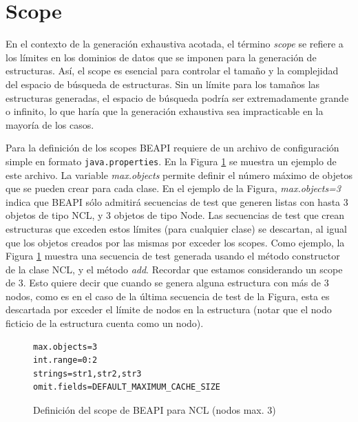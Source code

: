 \section{Scope}
\label{sec:scope}

En el contexto de la generación exhaustiva acotada, el término \emph{scope} se
refiere a los límites en los dominios de datos que se imponen para la generación de
estructuras. 
Así, el scope es esencial para controlar el tamaño y la complejidad del espacio de búsqueda de estructuras. 
Sin un límite para los tamaños las estructuras generadas,
 el espacio de búsqueda podría ser extremadamente grande o infinito, lo que haría
 que la generación exhaustiva sea impracticable en la mayoría de los casos. 

Para la definición de los scopes BEAPI requiere de un archivo de configuración
simple en formato \texttt{java.properties}. En la Figura \ref{fig:NCL-fin-BEAPI}
se muestra un ejemplo de este archivo. 
La variable \emph{max.objects} permite definir el número
máximo de objetos que se pueden crear para cada clase. En el ejemplo de la
Figura, \emph{max.objects=3} indica que BEAPI sólo admitirá secuencias de test que
generen listas con hasta 3 objetos de tipo NCL, y 3 objetos de tipo Node. Las
secuencias de test que crean estructuras que 
exceden estos límites (para cualquier clase) se descartan, al igual que los
objetos creados por las mismas por exceder los scopes. Como ejemplo, la Figura
\ref{sec:scope} muestra una secuencia de test generada usando el método constructor
de la clase NCL, y el método \emph{add}. Recordar que estamos considerando un scope de 3. 
Esto quiere decir que cuando se genera alguna estructura con más de 3 nodos, como es en 
el caso de la última secuencia de test de la Figura, esta es descartada por exceder el 
límite de nodos en la estructura (notar que el nodo ficticio de la estructura cuenta como un
nodo). 



\begin{figure}[H]
\begin{lstlisting}[keywordstyle=\scriptsize\ttfamily]
max.objects=3
int.range=0:2
strings=str1,str2,str3
omit.fields=DEFAULT_MAXIMUM_CACHE_SIZE
\end{lstlisting}
\caption{Definición del scope de BEAPI para NCL (nodos max. 3)}
\label{fig:NCL-fin-BEAPI}
\end{figure}


